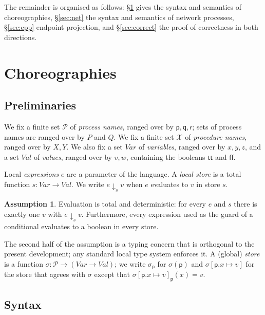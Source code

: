 \documentclass[11pt]{article}
\theoremstyle{plain}
\theoremstyle{definition}
\newtheorem{assumption}[theorem]{Assumption}
\theoremstyle{remark}
\newcommand{\ttrue}{\mathsf{tt}}
\newcommand{\ffalse}{\mathsf{ff}}
\newcommand{\pp}{\mathsf{p}}
\newcommand{\qq}{\mathsf{q}}
\newcommand{\rr}{\mathsf{r}}
\newcommand{\Procs}{\mathcal{P}}
\newcommand{\Var}{\mathit{Var}}
\newcommand{\Val}{\mathit{Val}}
\newcommand{\eval}[3]{#1 \downarrow_{#2} #3}
\newcommand{\upd}[3]{#1[#2 \mapsto #3]}
\newcommand{\Pnames}{\mathcal{X}}
\begin{document}
The remainder is organised as follows: \S\ref{sec:chor} gives the syntax and
semantics of choreographies, \S\ref{sec:net} the syntax and semantics of
network processes, \S\ref{sec:epp} endpoint projection, and
\S\ref{sec:correct} the proof of correctness in both directions.

\section{Choreographies}
\label{sec:chor}

\subsection{Preliminaries}

We fix a finite set $\Procs$ of \emph{process names}, ranged over by
$\pp,\qq,\rr$; sets of process names are ranged over by $P$ and $Q$.  We fix a
finite set $\Pnames$ of \emph{procedure names}, ranged over by $X,Y$.  We also
fix a set $\Var$ of \emph{variables}, ranged over by $x,y,z$, and a set $\Val$
of \emph{values}, ranged over by $v,w$, containing the booleans $\ttrue$ and
$\ffalse$.

Local \emph{expressions} $e$ are a parameter of the language.  A \emph{local
store} is a total function $s : \Var \to \Val$.  We write
$\eval{e}{s}{v}$ when $e$ evaluates to $v$ in store $s$.

\begin{assumption}\label{ass:eval}
  Evaluation is total and deterministic: for every $e$ and $s$ there is exactly
  one $v$ with $\eval{e}{s}{v}$.  Furthermore, every expression used as the
  guard of a conditional evaluates to a boolean in every store.
\end{assumption}

\noindent
The second half of the assumption is a typing concern that is orthogonal to the
present development; any standard local type system enforces it.  A (global)
\emph{store} is a function $\sigma : \Procs \to (\Var \to \Val)$; we write
$\sigma_\pp$ for $\sigma(\pp)$ and $\upd{\sigma}{\pp.x}{v}$ for the store that
agrees with $\sigma$ except that $\upd{\sigma}{\pp.x}{v}_\pp(x) = v$.

\subsection{Syntax}
\end{document}
